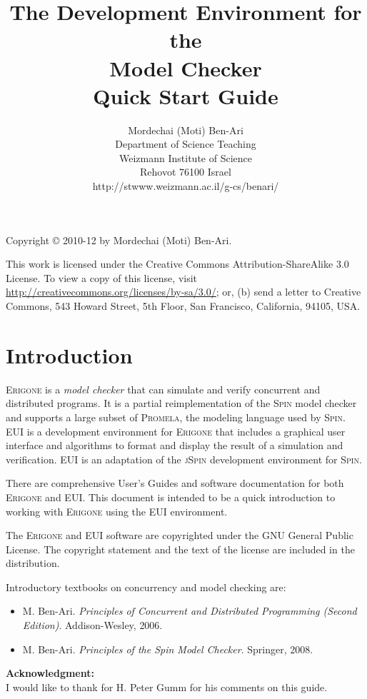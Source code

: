 \documentclass[11pt]{article}
\title{The \eui{} Development Environment for the\\
\prg{} Model Checker\\Quick Start Guide}
\author{Mordechai (Moti) Ben-Ari\\
Department of Science Teaching\\
Weizmann Institute of Science\\
Rehovot 76100 Israel\\
\textsf{http://stwww.weizmann.ac.il/g-cs/benari/}}
\newcommand*{\prg}{\textsc{Erigone}}
\newcommand*{\eui}{\textsc{EUI}}
\newcommand*{\spn}{\textsc{Spin}}
\newcommand*{\jsp}{\textsc{jSpin}}
\newcommand*{\prm}{\textsc{Promela}}
\begin{document}
\maketitle
\thispagestyle{empty}

\vfill

\begin{center}
Copyright \copyright{} 2010-12 by Mordechai (Moti) Ben-Ari.
\end{center}
This work is licensed under the Creative Commons Attribution-ShareAlike 3.0
License. To view a copy of this license, visit
\url{http://creativecommons.org/licenses/by-sa/3.0/}; or, (b) send a letter
to Creative Commons, 543 Howard Street, 5th Floor, San Francisco,
California, 94105, USA.

\newpage

\section{Introduction}

\prg{} is a \emph{model checker} that can simulate and verify concurrent
and distributed programs. It is a partial reimplementation of the \spn{}
model checker and supports a large subset of \prm{}, the modeling language
used by \spn{}. \eui{} is a development environment for \prg{} that
includes a graphical user interface and algorithms to format and display
the result of a simulation and verification. \eui{} is an adaptation of the
\jsp{} development environment for \spn{}.

There are comprehensive User's Guides and software documentation for
both \prg{} and \eui{}. This document is intended to be a quick
introduction to working with \prg{} using the \eui{} environment.

The \prg{} and \eui{} software are copyrighted under the \textsc{GNU}
General Public License. The copyright statement and the text of the
license are included in the distribution.

Introductory textbooks on concurrency and model checking are:

\begin{itemize}
\item M. Ben-Ari. \textit{Principles of Concurrent and Distributed Programming (Second
Edition)}. Addison-Wesley, 2006.
\item M. Ben-Ari. \textit{Principles of the Spin Model Checker}.
Springer, 2008.
\end{itemize}

\textbf{Acknowledgment:}\\I would like to thank for H. Peter Gumm for
his comments on this guide.
\end{document}

